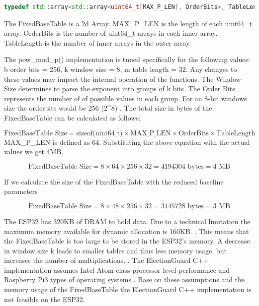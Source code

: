 \begin{lstlisting}[language=C++, caption={FixedBaseTable Definition}]
    typedef std::array<std::array<uint64_t[MAX_P_LEN], OrderBits>, TableLength> FixedBaseTable;
\end{lstlisting}

The FixedBaseTable is a 2d Array. MAX_P_LEN is the length of each uint64_t array. OrderBits is the number of uint64_t arrays in each inner array. TableLength is the number of inner arrays in the outer array. 


The pow_mod_p() implementation is tuned specifically for the following values: b order bits = 256, k window size = 8, m table length = 32. Any changes to these values may impact the internal operation of the functions. The Window Size determines to parse the exponent into groups of k bits. The Order Bits represents the number of of possible values in each group. For an 8-bit windows size the orderbits would be 256 (2^8) \cite[22]{eg-spec}. The total size in bytes of the FixedBaseTable can be calculated as follows:

\begin{equation}
    \text{FixedBaseTable Size} = \text{sizeof(uint64\_t)} \times \text{MAX\_P\_LEN} \times \text{OrderBits} \times \text{TableLength}
\end{equation}
MAX_P_LEN is defined as 64. Substituting the above equation with the actual values we get 4MB.

\begin{equation}
    \text{FixedBaseTable Size} = 8 \times 64 \times 256 \times 32 = 4194304 \text{ bytes} = 4 \text{ MB}
\end{equation}

If we calculate the size of the FixedBaseTable with the reduced baseline parameters

\begin{equation}
    \text{FixedBaseTable Size} = 8 \times 48 \times 256 \times 32 =  3145728 \text{ bytes} = 3 \text{ MB}
\end{equation}

The ESP32 has 320KB of DRAM to hold data. Due to a technical limitation the maximum memory available for dynamic allocation is 160KB. \cite{esp32-ref}. This means that the FixedBaseTable is too large to be stored in the ESP32's memory. A decrease in window size k leads to smaller tables and thus less memory usage, but increases the number of multiplications. \cite[22]{eg-spec}. The ElectionGuard C++ implementation assumes Intel Atom class processor level performance and Raspberry Pi3 types of operating systems \cite{eg-docs}. Base on these assumptions and the memory usage of the FixedBaseTable the ElectionGuard C++ implementation is not feasible on the ESP32.

